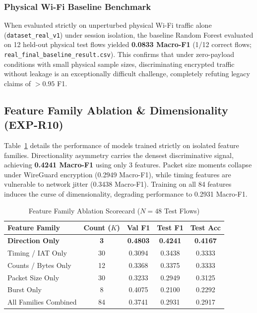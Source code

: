 \documentclass[conference]{IEEEtran}
\begin{document}
\subsubsection{Physical Wi-Fi Baseline Benchmark}
When evaluated strictly on unperturbed physical Wi-Fi traffic alone (\texttt{dataset\_real\_v1}) under session isolation, the baseline Random Forest evaluated on 12 held-out physical test flows yielded \textbf{0.0833 Macro-F1} (1/12 correct flows; \texttt{real\_final\_baseline\_result.csv}). This confirms that under zero-payload conditions with small physical sample sizes, discriminating encrypted traffic without leakage is an exceptionally difficult challenge, completely refuting legacy claims of $>0.95$ F1.

\subsection{Feature Family Ablation \& Dimensionality (EXP-R10)}
Table~\ref{tab:feature_family_ablation} details the performance of models trained strictly on isolated feature families. Directionality asymmetry carries the densest discriminative signal, achieving \textbf{0.4241 Macro-F1} using only 3 features. Packet size moments collapse under WireGuard encryption (0.2949 Macro-F1), while timing features are vulnerable to network jitter (0.3438 Macro-F1). Training on all 84 features induces the curse of dimensionality, degrading performance to 0.2931 Macro-F1.

\begin{table}[t]
\centering
\caption{Feature Family Ablation Scorecard ($N=48$ Test Flows)}
\label{tab:feature_family_ablation}
\footnotesize
\begin{tabularx}{\columnwidth}{lcccc}
\toprule
\textbf{Feature Family} & \textbf{Count ($K$)} & \textbf{Val F1} & \textbf{Test F1} & \textbf{Test Acc} \\
\midrule
\textbf{Direction Only} & \textbf{3} & \textbf{0.4803} & \textbf{0.4241} & \textbf{0.4167} \\
Timing / IAT Only & 30 & 0.3094 & 0.3438 & 0.3333 \\
Counts / Bytes Only & 12 & 0.3368 & 0.3375 & 0.3333 \\
Packet Size Only & 30 & 0.3233 & 0.2949 & 0.3125 \\
Burst Only & 8 & 0.4075 & 0.2100 & 0.2292 \\
All Families Combined & 84 & 0.3741 & 0.2931 & 0.2917 \\
\bottomrule
\end{tabularx}
\end{table}
\end{document}
